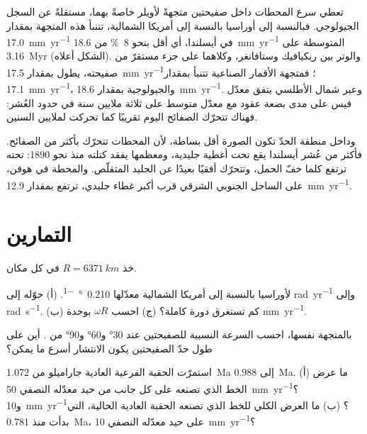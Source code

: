 تعطي سرع المحطات داخل صفيحتين متجهةً لأويلر خاصةً بهما، مستقلةً عن السجل الجيولوجي. فبالنسبة إلى أوراسيا بالنسبة إلى أمريكا الشمالية، تتنبأ هذه المتجهة بمقدار \qty{17.0}{mm.yr^{-1}} في أيسلندا، أي أقل بنحو \qty{8}{\percent} من \qty{18.6}{mm.yr^{-1}} المتوسطة على \qty{3.16}{Myr} (الشكل أعلاه). والوتر بين ريكيافيك وستافانغر، وكلاهما على جزء مستقرّ من صفيحته، يطول بمقدار \qty{17.5}{mm.yr^{-1}}؛ فمتجهة الأقمار الصناعية تتنبأ بمقدار \qty{17.1}{mm.yr^{-1}}، والجيولوجية بمقدار \qty{18.6}{mm.yr^{-1}}. وعبر شمال الأطلسي يتفق معدّل قيس على مدى بضعة عقود مع معدّل متوسط على ثلاثة ملايين سنة في حدود العُشر: فهناك تتحرّك الصفائح اليوم تقريبًا كما تحركت لملايين السنين.

وداخل منطقة الحدّ تكون الصورة أقل بساطة، لأن المحطات تتحرّك بأكثر من الصفائح. فأكثر من عُشر أيسلندا يقع تحت أغطية جليدية، ومعظمها يفقد كتلته منذ نحو 1890:  تحته ترتفع كلما خفّ الحمل، وتتحرّك أفقيًا بعيدًا عن الجليد المتقلّص. والمحطة في هوفن، على الساحل الجنوبي الشرقي قرب أكبر غطاء جليدي، ترتفع بمقدار \qty{12.9}{mm.yr^{-1}}.

\section{التمارين}

خذ $R = \qty{6371}{km}$ في كل مكان.

\begin{exercise}[$\star$]\label{exo:b1:plate-kinematics:1}
 لأوراسيا بالنسبة إلى أمريكا الشمالية معدّلها \qty{0.210}{\degree\per\Myr}. (أ) حوّله إلى \unit{rad.yr^{-1}} وإلى \unit{rad.s^{-1}}. (ب) كم تستغرق دورة كاملة؟ (ج) احسب $\omega R$ بوحدة \unit{mm.yr^{-1}}.
\end{exercise}

\begin{exercise}[$\star$]\label{exo:b1:plate-kinematics:2}
بالمتجهة نفسها، احسب السرعة النسبية للصفيحتين عند \ang{30} و\ang{60} و\ang{90} من . أين على طول حدّ الصفيحتين يكون الانتشار أسرع ما يمكن؟
\end{exercise}

\begin{exercise}[$\star$]\label{exo:b1:plate-kinematics:3}
استمرّت الحقبة الفرعية العادية جاراميلو من \qty{1.072}{Ma} إلى \qty{0.988}{Ma}. (أ) ما عرض الخط الذي تصنعه على كل جانب من حيد معدّله النصفي \qty{50}{mm.yr^{-1}}؟ و\qty{10}{mm.yr^{-1}}؟ (ب) ما العرض الكلي للخط الذي تصنعه الحقبة العادية الحالية، التي بدأت منذ \qty{0.781}{Ma}، على حيد معدّله النصفي \qty{10}{mm.yr^{-1}}؟
\end{exercise}

